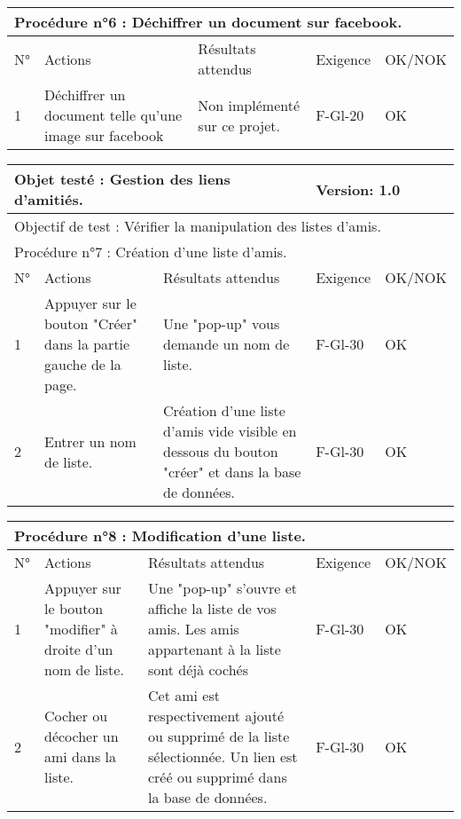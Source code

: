 \documentclass[a4paper,11pt,french]{article}
\begin{document}
\vspace{1cm}
\hspace{-1cm}
\begin{tabular}{|p{1cm}|p{5cm}|p{5cm}|p{2cm}|p{2cm}|}
\hline
\multicolumn{5}{|l|}{Procédure n°6 : Déchiffrer un document sur facebook.} \\
\hline
N° & Actions & Résultats attendus & Exigence & OK/NOK \\
\hline
1 & Déchiffrer un document telle qu'une image sur facebook & Non implémenté sur ce projet. & F-Gl-20 & OK \\
\hline
\end{tabular}

\vspace{3cm}
\hspace{-1cm}
\begin{tabular}{|p{1cm}|p{5cm}|p{5cm}|p{2cm}|p{2cm}|}
\hline
\multicolumn{3}{|l|}{Objet testé : Gestion des liens d'amitiés.} & \multicolumn{2}{|l|}{Version: 1.0} \\
\hline
\multicolumn{5}{|l|}{Objectif de test : Vérifier la manipulation des listes d'amis.} \\
\hline
\multicolumn{5}{|l|}{Procédure n°7 : Création d'une liste d'amis.} \\
\hline
N° & Actions & Résultats attendus & Exigence & OK/NOK \\
\hline
1 & Appuyer sur le bouton "Créer" dans la partie gauche de la page. & Une "pop-up" vous demande un nom de liste. & F-Gl-30 & OK \\
\hline
2 & Entrer un nom de liste. & Création d'une liste d'amis vide visible en dessous du bouton "créer" et dans la base de données. & F-Gl-30 & OK \\
\hline
\end{tabular}

\vspace{1cm}
\hspace{-1cm}
\begin{tabular}{|p{1cm}|p{5cm}|p{5cm}|p{2cm}|p{2cm}|}
\hline
\multicolumn{5}{|l|}{Procédure n°8 : Modification d'une liste.} \\
\hline
N° & Actions & Résultats attendus & Exigence & OK/NOK \\
\hline
1 & Appuyer sur le bouton "modifier" à droite d'un nom de liste. & Une "pop-up" s'ouvre et affiche la liste de vos amis. Les amis appartenant à la liste sont déjà cochés & F-Gl-30 & OK \\
\hline
2 & Cocher ou décocher un ami dans la liste. & Cet ami est respectivement ajouté ou supprimé de la liste sélectionnée. Un lien est créé ou supprimé dans la base de données. & F-Gl-30 & OK \\
\hline
\end{tabular}
\end{document}
